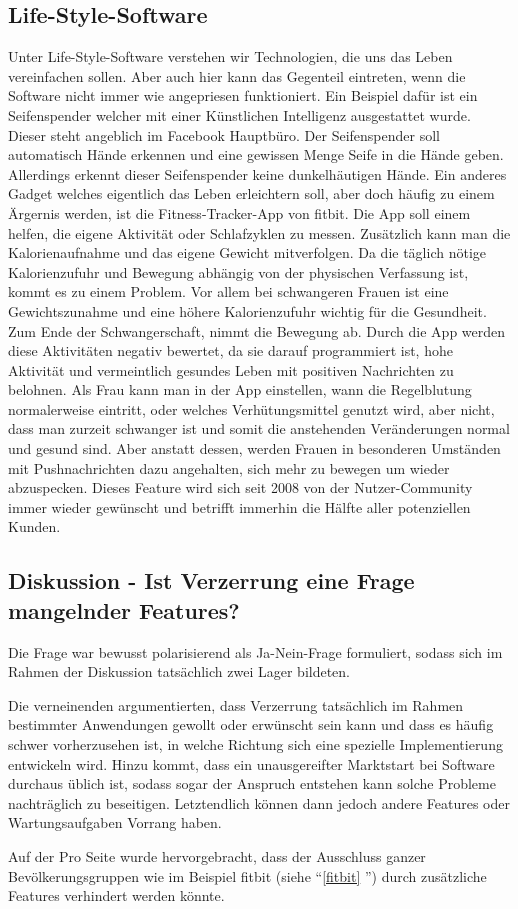 \subsection{Life-Style-Software}
Unter Life-Style-Software verstehen wir Technologien, die uns das Leben vereinfachen sollen. Aber auch hier kann das Gegenteil eintreten, wenn die Software nicht immer wie angepriesen funktioniert. 
Ein Beispiel dafür ist ein Seifenspender welcher mit einer Künstlichen Intelligenz ausgestattet wurde. Dieser steht angeblich im Facebook Hauptbüro. 
Der Seifenspender soll automatisch Hände erkennen und eine gewissen Menge Seife in die Hände geben. Allerdings erkennt dieser Seifenspender keine dunkelhäutigen Hände.  \newline 
\label{fitbit}
Ein anderes Gadget welches eigentlich das Leben erleichtern soll, aber doch häufig zu einem Ärgernis werden, ist die Fitness-Tracker-App von fitbit. Die App soll einem helfen, die eigene Aktivität oder Schlafzyklen zu messen. Zusätzlich kann man die Kalorienaufnahme und das eigene Gewicht mitverfolgen. Da die täglich nötige Kalorienzufuhr und Bewegung abhängig von der physischen Verfassung ist, kommt es zu einem Problem. Vor allem bei schwangeren Frauen ist eine Gewichtszunahme und eine höhere Kalorienzufuhr wichtig für die Gesundheit. Zum Ende der Schwangerschaft, nimmt die Bewegung ab. Durch die App werden diese Aktivitäten negativ bewertet, da sie darauf programmiert ist, hohe Aktivität und vermeintlich gesundes Leben mit positiven Nachrichten zu belohnen. 
Als Frau kann man in der App einstellen, wann die Regelblutung normalerweise eintritt, oder welches Verhütungsmittel genutzt wird, aber nicht, dass man zurzeit schwanger ist und somit die anstehenden Veränderungen normal und gesund sind. \citeauthor{becomingmotherblog2017}
Aber anstatt dessen, werden Frauen in besonderen Umständen mit Pushnachrichten dazu angehalten, sich mehr zu bewegen um wieder abzuspecken. 
Dieses Feature wird sich seit 2008 von der Nutzer-Community immer wieder gewünscht und betrifft immerhin die Hälfte aller potenziellen Kunden. 


\subsection[feature]{Diskussion - Ist Verzerrung eine Frage mangelnder Features?}
Die Frage war bewusst polarisierend als Ja-Nein-Frage formuliert, sodass sich im Rahmen der Diskussion tatsächlich zwei Lager bildeten.

Die verneinenden argumentierten, dass Verzerrung tatsächlich im Rahmen bestimmter Anwendungen gewollt oder erwünscht sein kann und dass es häufig schwer vorherzusehen ist, in welche Richtung sich eine spezielle Implementierung entwickeln wird. Hinzu kommt, dass ein unausgereifter Marktstart bei Software durchaus üblich ist, sodass sogar der Anspruch entstehen kann solche Probleme nachträglich zu beseitigen. Letztendlich können dann jedoch andere Features oder Wartungsaufgaben Vorrang haben.

Auf der Pro Seite wurde hervorgebracht, dass der Ausschluss ganzer Bevölkerungsgruppen wie im Beispiel fitbit (siehe \enquote{\ref{fitbit} }) durch zusätzliche Features verhindert werden könnte.

